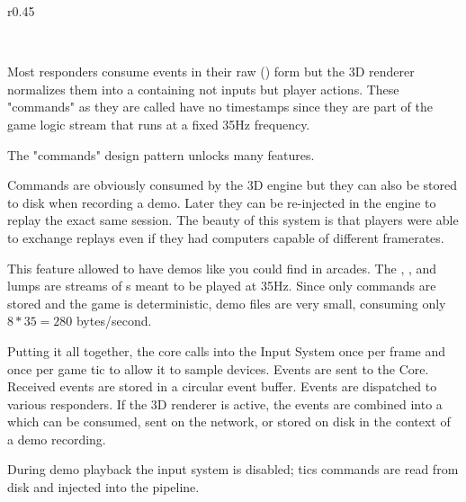 \begin{wrapfigure}[12]{r}{0.45\textwidth}
\centering
{}
\end{wrapfigure}
\\
\par
Most responders consume events in their raw () form but the 3D renderer normalizes them into a  containing not inputs but player actions. These "commands" as they are called have no timestamps since they are part of the game logic stream that runs at a fixed 35Hz frequency. \\
\par
{} \label{cmd_t_type}
\par
The "commands" design pattern unlocks many features. \\
\par
Commands are obviously consumed by the 3D engine but they can also be stored to disk when recording a demo. Later they can be re-injected in the engine to replay the exact same session. The beauty of this system is that players were able to exchange replays even if they had computers capable of different framerates.\\
\par
This feature allowed \doom{} to have demos like you could find in arcades. The , , and  lumps are streams of s meant to be played at 35Hz. Since only commands are stored and the game is deterministic, demo files are very small, consuming only $ 8 * 35 = 280 $ bytes/second.\\

\par
Putting it all together,  the core calls into the Input System once per frame and once per game tic to allow it to sample devices.  Events are sent to the Core.  Received events are stored in a circular event buffer.  Events are dispatched to various responders. If the 3D renderer is active, the events are combined into a  which can be consumed, sent on the network, or stored on disk in the context of a demo recording.\\
\par
 During demo playback the input system is disabled; tics commands are read from disk and injected into the pipeline.

